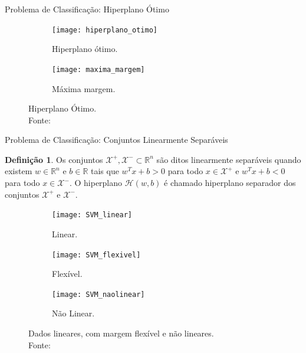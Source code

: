 \documentclass{beamer}
\def\Xset{\mathcal{X}}
\def\Hset{\mathcal{H}}
\def\RR{\mathds{R}}
\theoremstyle{definition}%
\newtheorem{defi}{Definição}
\begin{document}
\begin{frame}{Problema de Classificação: Hiperplano Ótimo}
\begin{figure}[h] 
	\centering
	\begin{subfigure}[h]{0.4\textwidth}
		\centering
		\texttt{[image: hiperplano\_otimo]}
		\caption{Hiperplano ótimo. \label{fig3:a}}
	\end{subfigure}
	\begin{subfigure}[h]{0.4\textwidth}
		\centering
		\texttt{[image: maxima\_margem]}
		\caption{Máxima margem. \label{fig3:b}}	
	\end{subfigure}
	\caption{Hiperplano Ótimo. \label{fig3}
		\\ Fonte: \textcite{Evelin2017}}
\end{figure}
\end{frame}


\begin{frame}{Problema de Classificação: Conjuntos Linearmente Separáveis}
\begin{defi} \label{def1} Os conjuntos $\Xset^{+}, \Xset^{-} \subset \RR^n$ são ditos linearmente separáveis quando existem $w\in \RR^n$ e $b\in \RR$  tais que $w^{T}x+b>0$ para todo $x\in \Xset^{+}$ e $w^{T}x+b<0$ para todo $x\in \Xset^{-}$. O hiperplano $\Hset(w,b)$ é chamado hiperplano separador dos conjuntos $\Xset^{+}$ e $\Xset^{-}$.
\end{defi}

\begin{figure}[!h] 
	\centering
	\begin{subfigure}[h]{0.20\textwidth}
		\centering
		\texttt{[image: SVM\_linear]}
		\caption{Linear. \label{fig1:a}}
	\end{subfigure}
	\begin{subfigure}[!h]{0.20\textwidth}
		\centering
		\texttt{[image: SVM\_flexivel]}
		\caption{Flexível. \label{fig1:b}}
	\end{subfigure}
	\begin{subfigure}[!h]{0.20\textwidth}
		\centering
		\texttt{[image: SVM\_naolinear]}
		\caption{Não Linear. \label{fig1:c}}
	\end{subfigure}
	\caption{Dados lineares, com margem flexível e não lineares. \label{fig1}\\ Fonte: \textcite{Evelin2017}}
\end{figure}
\end{frame}
\end{document}
